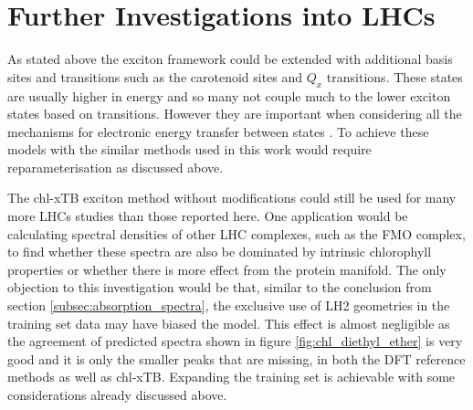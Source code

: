 \section{Further Investigations into LHCs}
\label{sec:lhc_investigations}

As stated above the exciton framework could be extended with additional basis sites
and transitions such as the carotenoid sites and $Q_x$ transitions. These states 
are usually higher in energy and so many not couple much to the lower exciton states
based on \Qy transitions. However they are important when considering all the mechanisms
for electronic energy transfer between states \cite{Polli2006}. To achieve these
models with the similar methods used in this work would require reparameterisation 
as discussed above.

The chl-xTB exciton method without modifications could still be used for many more
LHCs studies than those reported here. One application would be calculating spectral 
densities of other LHC complexes, such as the FMO complex, to find whether these 
spectra are also be dominated by intrinsic chlorophyll properties or whether there 
is more effect from the protein manifold. The only objection to this investigation 
would be that, similar to the conclusion from section \ref{subsec:absorption_spectra}, 
the exclusive use of LH2 geometries in the training set data may have biased the 
model. This effect is almost negligible as the agreement of predicted spectra shown 
in figure \ref{fig:chl_diethyl_ether} is very good and it is only the smaller \Qy 
peaks that are missing, in both the DFT reference methods as well as chl-xTB. Expanding 
the training set is achievable with some considerations already discussed above.

